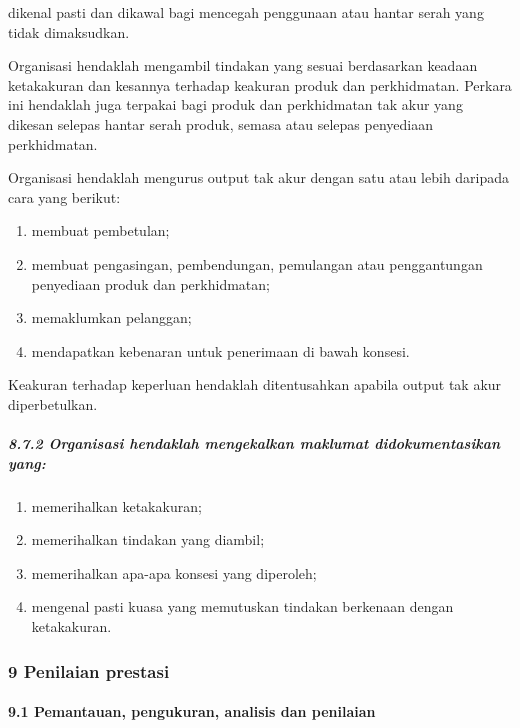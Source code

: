 \documentclass[
]{article}
\begin{document}
dikenal pasti dan dikawal bagi mencegah penggunaan atau hantar serah
yang tidak dimaksudkan.

Organisasi hendaklah mengambil tindakan yang sesuai berdasarkan keadaan
ketakakuran dan kesannya terhadap keakuran produk dan perkhidmatan.
Perkara ini hendaklah juga terpakai bagi produk dan perkhidmatan tak
akur yang dikesan selepas hantar serah produk, semasa atau selepas
penyediaan perkhidmatan.

Organisasi hendaklah mengurus output tak akur dengan satu atau lebih
daripada cara yang berikut:

\begin{enumerate}
\def\labelenumi{\alph{enumi})}
\item
  membuat pembetulan;
\item
  membuat pengasingan, pembendungan, pemulangan atau penggantungan
  penyediaan produk dan perkhidmatan;
\item
  memaklumkan pelanggan;
\item
  mendapatkan kebenaran untuk penerimaan di bawah konsesi.
\end{enumerate}

Keakuran terhadap keperluan hendaklah ditentusahkan apabila output tak
akur diperbetulkan.

\hypertarget{organisasi-hendaklah-mengekalkan-maklumat-didokumentasikan-yang}{%
\subparagraph{8.7.2 Organisasi hendaklah mengekalkan maklumat
didokumentasikan
yang:}\label{organisasi-hendaklah-mengekalkan-maklumat-didokumentasikan-yang}}

\begin{enumerate}
\def\labelenumi{\alph{enumi})}
\item
  memerihalkan ketakakuran;
\item
  memerihalkan tindakan yang diambil;
\item
  memerihalkan apa-apa konsesi yang diperoleh;
\item
  mengenal pasti kuasa yang memutuskan tindakan berkenaan dengan
  ketakakuran.
\end{enumerate}

\hypertarget{penilaian-prestasi}{%
\subsubsection{9 Penilaian prestasi}\label{penilaian-prestasi}}

\hypertarget{pemantauan-pengukuran-analisis-dan-penilaian}{%
\paragraph{9.1 Pemantauan, pengukuran, analisis dan
penilaian}\label{pemantauan-pengukuran-analisis-dan-penilaian}}
\end{document}
